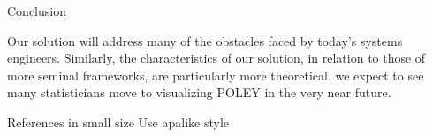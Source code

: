 Conclusion

 Our solution will address many of the obstacles faced by today's
 systems engineers. Similarly, the characteristics of our solution, in
 relation to those of more seminal frameworks, are particularly more
 theoretical. we expect to see many statisticians move to visualizing
 POLEY in the very near future.



References in small size
Use apalike style